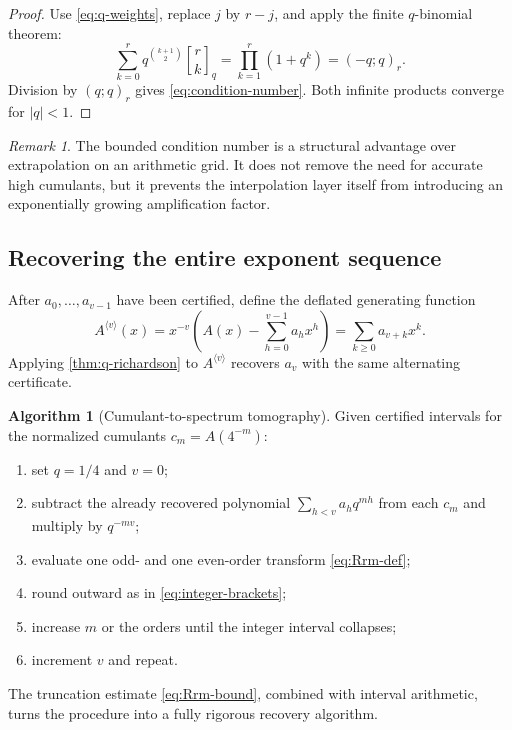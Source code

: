 \documentclass[11pt,oneside]{article}
\numberwithin{equation}{section}
\theoremstyle{definition}
\newtheorem{algorithm}[theorem]{Algorithm}
\theoremstyle{remark}
\newtheorem{remark}[theorem]{Remark}
\newcommand{\qbinom}[3]{\genfrac{[}{]}{0pt}{}{#1}{#2}_{#3}}
\begin{document}
\begin{proof}
Use \eqref{eq:q-weights}, replace $j$ by $r-j$, and apply the finite $q$-binomial theorem:
\[
 \sum_{k=0}^{r}q^{\binom{k+1}{2}}\qbinom{r}{k}{q}
 =\prod_{k=1}^{r}(1+q^k)=(-q;q)_r.
\]
Division by $(q;q)_r$ gives \eqref{eq:condition-number}.  Both infinite products converge
for $|q|<1$.
\end{proof}

\begin{remark}
The bounded condition number is a structural advantage over extrapolation on an arithmetic
grid.  It does not remove the need for accurate high cumulants, but it prevents the
interpolation layer itself from introducing an exponentially growing amplification factor.
\end{remark}

\subsection{Recovering the entire exponent sequence}

After $a_0,\ldots,a_{v-1}$ have been certified, define the deflated generating function
\begin{equation}
 A^{\langle v\rangle}(x)
 =x^{-v}\left(A(x)-\sum_{h=0}^{v-1}a_hx^h\right)
 =\sum_{k\ge0}a_{v+k}x^k.
 \label{eq:deflated-A}
\end{equation}
Applying \cref{thm:q-richardson} to $A^{\langle v\rangle}$ recovers $a_v$ with the same
alternating certificate.

\begin{algorithm}[Cumulant-to-spectrum tomography]
\label{alg:tomography}
Given certified intervals for the normalized cumulants $c_m=A(4^{-m})$:
\begin{enumerate}
\item set $q=1/4$ and $v=0$;
\item subtract the already recovered polynomial
      $\sum_{h<v}a_hq^{mh}$ from each $c_m$ and multiply by $q^{-mv}$;
\item evaluate one odd- and one even-order transform \eqref{eq:Rrm-def};
\item round outward as in \eqref{eq:integer-brackets};
\item increase $m$ or the orders until the integer interval collapses;
\item increment $v$ and repeat.
\end{enumerate}
The truncation estimate \eqref{eq:Rrm-bound}, combined with interval arithmetic, turns the
procedure into a fully rigorous recovery algorithm.
\end{algorithm}
\end{document}

